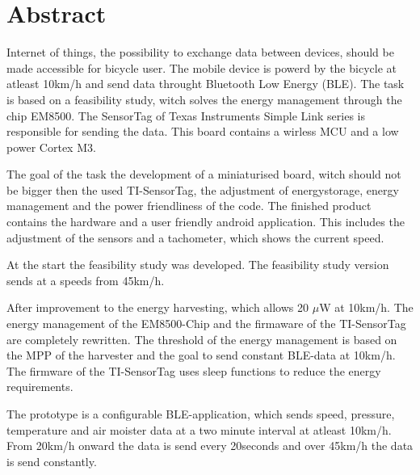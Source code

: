 \chapter*{Abstract}

Internet of things, the possibility to exchange data between devices, should be made accessible for bicycle user. The mobile device is powerd by the bicycle at atleast 10km/h and send data throught Bluetooth Low Energy (BLE). The task is based on a feasibility study, witch solves the energy management through the chip EM8500. The SensorTag of Texas Instruments Simple Link series is responsible for sending the data. This board contains a wirless MCU and a low power Cortex M3.

The goal of the task the development of a miniaturised board, witch should not be bigger then the used TI-SensorTag, the adjustment of energystorage, energy management and the power friendliness of the code. The finished product contains the hardware and a user friendly android application. This includes the adjustment of the sensors and a tachometer, which shows the current speed.

At the start the feasibility study was developed. The feasibility study version sends at a speeds from 45km/h.

After improvement to the energy harvesting, which allows 20 $\mu$W at 10km/h. The energy management of the EM8500-Chip and the firmaware of the TI-SensorTag are completely rewritten. The threshold of the energy management is based on the MPP of the harvester and the goal to send constant BLE-data at 10km/h. The firmware of the TI-SensorTag uses sleep functions to reduce the energy requirements.

The prototype is a configurable BLE-application, which sends speed, pressure, temperature and air moister data at a two minute interval at atleast 10km/h. From 20km/h onward the data is send every  20seconds and over 45km/h the data is send constantly.
